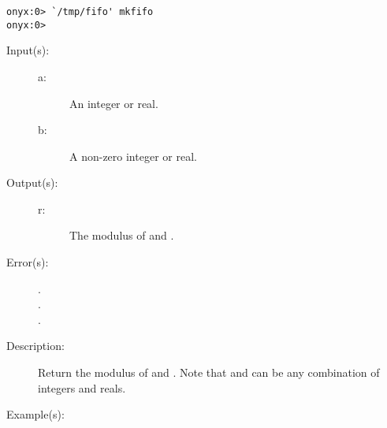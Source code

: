 \begin{description}
\begin{description}
\begin{verbatim}
onyx:0> `/tmp/fifo' mkfifo
onyx:0>
		\end{verbatim}
	\end{description}
\label{systemdict:mod}
\item[{\onyxop{a b}{mod}{r}}: ]
	\begin{description}\item[]
	\item[Input(s): ]
		\begin{description}\item[]
		\item[a: ]
			An integer or real.
		\item[b: ]
			A non-zero integer or real.
		\end{description}
	\item[Output(s): ]
		\begin{description}\item[]
		\item[r: ]
			The modulus of  and .
		\end{description}
	\item[Error(s): ]
		\begin{description}\item[]
		\item[.]
		\item[.]
		\item[.]
		\end{description}
	\item[Description: ]
			Return the modulus of  and .  Note
			that  and  can be any combination of
			integers and reals.
	\item[Example(s): ]\begin{verbatim}


\end{verbatim}
\end{description}
\end{description}
